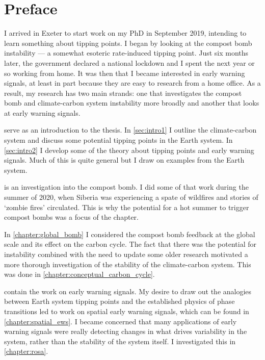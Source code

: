 \chapter{Preface}

I arrived in Exeter to start work on my PhD in September 2019, intending to learn something about tipping points. I began by looking at the compost
bomb instability --- a somewhat esoteric rate-induced tipping point. Just six months later, the government declared a national lockdown
and I spent the next year or so working from home. It was then  that I became interested in early warning signals, at least in part because they are
easy to research from a home office. As a result, my research has two main strands: one that investigates the compost bomb and climate-carbon system instability more broadly
and another that looks at early warning signals.

 serve as an introduction to the thesis. In \cref{sec:intro1} I outline the climate-carbon system and discuss some potential
tipping points in the Earth system. In \cref{sec:intro2} I develop some of the theory about tipping points and early warning signals. Much of this is
quite general but I draw on examples from the Earth system.

 is an investigation into the compost bomb. I did some of that work during the summer of 2020, when Siberia
was experiencing a spate of wildfires and stories of `zombie fires' circulated. This is why the potential for a hot summer to trigger compost bombs
was a focus of the chapter.

In \cref{chapter:global_bomb} I considered the compost bomb feedback at the global scale and its effect on the carbon cycle.
The fact that there was the potential for instability combined with the need to update some older research motivated a more thorough investigation of
the stability of the climate-carbon system. This was done in \cref{chapter:conceptual_carbon_cycle}.

 contain the work on early warning signals. My desire to draw out the analogies between Earth system
tipping points and the established physics of phase transitions led to work on spatial early warning signals, which can be found in \cref{chapter:spatial_ews}.
I became concerned that many applications of early warning signals were really detecting changes in what drives variability in the system, rather than the stability
of the system itself. I investigated this in \cref{chapter:rosa}.

